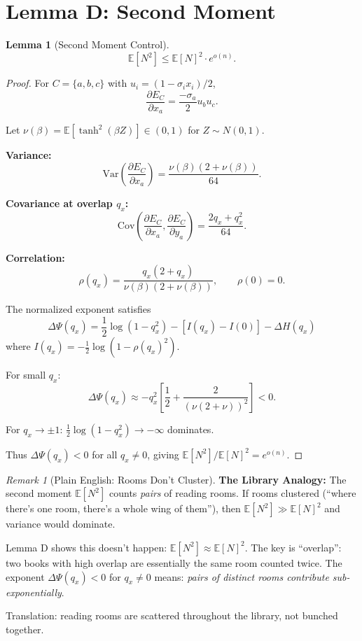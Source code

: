\documentclass[11pt,a4paper]{article}
\theoremstyle{plain}
\newtheorem{lemma}[theorem]{Lemma}
\theoremstyle{definition}
\theoremstyle{remark}
\newtheorem{remark}[theorem]{Remark}
\newcommand{\E}{\mathbb{E}}
\newcommand{\Cov}{\mathrm{Cov}}
\newcommand{\Var}{\mathrm{Var}}
\begin{document}
\section{Lemma D: Second Moment}

\begin{lemma}[Second Moment Control]
\label{lem:second-moment}
\[
\E[N^2] \leq \E[N]^2 \cdot e^{o(n)}.
\]
\end{lemma}

\begin{proof}
For $C = \{a, b, c\}$ with $u_i = (1 - \sigma_i x_i)/2$,
\[
\frac{\partial E_C}{\partial x_a} = \frac{-\sigma_a}{2} u_b u_c.
\]

Let $\nu(\beta) = \E[\tanh^2(\beta Z)] \in (0,1)$ for $Z \sim N(0,1)$.

\textbf{Variance:}
\[
\Var\left(\frac{\partial E_C}{\partial x_a}\right) = \frac{\nu(\beta)(2 + \nu(\beta))}{64}.
\]

\textbf{Covariance at overlap $q_x$:}
\[
\Cov\left(\frac{\partial E_C}{\partial x_a}, \frac{\partial E_C}{\partial y_a}\right) = \frac{2q_x + q_x^2}{64}.
\]

\textbf{Correlation:}
\[
\rho(q_x) = \frac{q_x(2 + q_x)}{\nu(\beta)(2 + \nu(\beta))}, \qquad \rho(0) = 0.
\]

The normalized exponent satisfies
\[
\Delta\Psi(q_x) = \frac{1}{2}\log(1 - q_x^2) - [I(q_x) - I(0)] - \Delta H(q_x)
\]
where $I(q_x) = -\frac{1}{2}\log(1 - \rho(q_x)^2)$.

For small $q_x$:
\[
\Delta\Psi(q_x) \approx -q_x^2 \left[\frac{1}{2} + \frac{2}{(\nu(2+\nu))^2}\right] < 0.
\]

For $q_x \to \pm 1$: $\frac{1}{2}\log(1 - q_x^2) \to -\infty$ dominates.

Thus $\Delta\Psi(q_x) < 0$ for all $q_x \neq 0$, giving $\E[N^2]/\E[N]^2 = e^{o(n)}$.
\end{proof}

\begin{remark}[Plain English: Rooms Don't Cluster]
\textbf{The Library Analogy:} The second moment $\E[N^2]$ counts \textit{pairs} of reading rooms. If rooms clustered (``where there's one room, there's a whole wing of them''), then $\E[N^2] \gg \E[N]^2$ and variance would dominate.

Lemma D shows this doesn't happen: $\E[N^2] \approx \E[N]^2$. The key is ``overlap'': two books with high overlap are essentially the same room counted twice. The exponent $\Delta\Psi(q_x) < 0$ for $q_x \neq 0$ means: \textit{pairs of distinct rooms contribute sub-exponentially}.

Translation: reading rooms are scattered throughout the library, not bunched together.
\end{remark}
\end{document}

